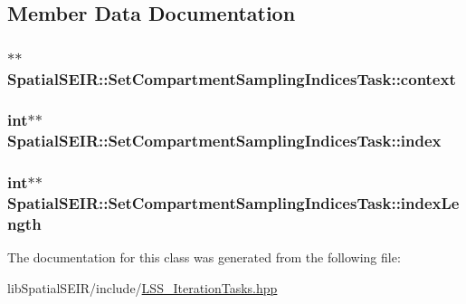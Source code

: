 \subsection{Member Data Documentation}
\hypertarget{classSpatialSEIR_1_1SetCompartmentSamplingIndicesTask_a52dd5ee41a16c253719145db4619f21d}{
\subsubsection[{context}]{$\ast$$\ast$ Spatial\-S\-E\-I\-R\-::\-Set\-Compartment\-Sampling\-Indices\-Task\-::context}}\label{classSpatialSEIR_1_1SetCompartmentSamplingIndicesTask_a52dd5ee41a16c253719145db4619f21d}
\hypertarget{classSpatialSEIR_1_1SetCompartmentSamplingIndicesTask_aa886632dfda17a6f9a00cb1161685c35}{
\subsubsection[{index}]{\setlength{\rightskip}{0pt plus 5cm}int$\ast$$\ast$ Spatial\-S\-E\-I\-R\-::\-Set\-Compartment\-Sampling\-Indices\-Task\-::index}}\label{classSpatialSEIR_1_1SetCompartmentSamplingIndicesTask_aa886632dfda17a6f9a00cb1161685c35}
\hypertarget{classSpatialSEIR_1_1SetCompartmentSamplingIndicesTask_ae9c42a17508247572b82dd6357ecafed}{
\subsubsection[{index\-Length}]{\setlength{\rightskip}{0pt plus 5cm}int$\ast$$\ast$ Spatial\-S\-E\-I\-R\-::\-Set\-Compartment\-Sampling\-Indices\-Task\-::index\-Length}}\label{classSpatialSEIR_1_1SetCompartmentSamplingIndicesTask_ae9c42a17508247572b82dd6357ecafed}


The documentation for this class was generated from the following file\-:\begin{DoxyCompactItemize}
\item 
lib\-Spatial\-S\-E\-I\-R/include/\hyperlink{LSS__IterationTasks_8hpp}{L\-S\-S\-\_\-\-Iteration\-Tasks.\-hpp}\end{DoxyCompactItemize}
